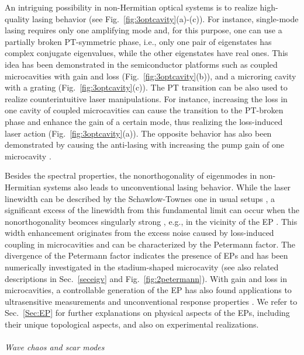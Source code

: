 \documentclass{tADP2e}
\theoremstyle{plain}
\theoremstyle{plain}
\theoremstyle{definition}
\begin{document}
\vspace{3pt}
\noindent
An intriguing possibility in non-Hermitian optical systems is to realize high-quality lasing behavior (see Fig.~\ref{fig:3optcavity}(a)-(c)). For instance, single-mode lasing  requires only one amplifying mode and, for this purpose, one can use a partially broken PT-symmetric phase, i.e., only one pair of eigenstates has complex conjugate eigenvalues, while the other eigenstates have real ones. This idea has been demonstrated in the semiconductor platforms such as coupled microcavities with gain and loss \cite{Miri:12,HH14} (Fig.~\ref{fig:3optcavity}(b)), and a microring cavity with a grating \cite{LF14} (Fig.~\ref{fig:3optcavity}(c)). 
The PT transition can be also used to realize counterintuitive laser manipulations. For instance, increasing the loss in one cavity of coupled microcavities can cause the transition to the PT-broken phase and enhance the gain of a certain mode, thus realizing the loss-induced laser action \cite{PB14} (Fig.~\ref{fig:3optcavity}(a)). The opposite behavior has also been demonstrated by causing the anti-lasing with increasing the pump gain of one microcavity \cite{LM12,BM14}.  
 
Besides the spectral properties, the nonorthogonality of eigenmodes in non-Hermitian systems also leads to unconventional lasing behavior. While the laser linewidth can be described by the Schawlow-Townes one in usual setups \cite{SAL58}, a significant excess of the linewidth from this fundamental limit can occur when the nonorthogonality beomces singularly strong \cite{HWA90}, e.g., in the vicinity of the EP \cite{MVB03}. This width enhancement originates from the excess noise caused by loss-induced coupling in microcavities and can be characterized by the Petermann factor. The divergence of the Petermann factor \cite{KP79} indicates the presence of EPs and has been numerically investigated in the stadium-shaped microcavity \cite{LSY08} (see also related descriptions in Sec.~\ref{seceigv} and Fig.~\ref{fig:2petermann}).
With gain and loss in microcavities, a controllable generation of the EP has also found applications to ultrasensitive measurements \cite{LZP16,CW17,HH17} and unconventional response properties \cite{WJ11,MK14,PB16,MP16}. We refer to Sec.~\ref{Sec:EP} for further explanations on physical aspects of the EPs, including their unique topological aspects, and also on experimental realizations.
\\ \\ {\it Wave chaos and scar modes}
\end{document}
